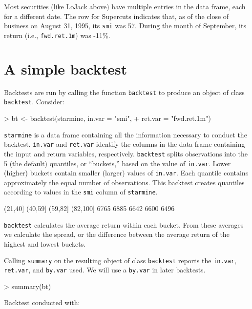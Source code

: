 \documentclass[a4paper]{report}
\begin{document}
\begin{article}
Most securities (like LoJack above) have multiple entries in the data
frame, each for a different date.  The row for Supercuts indicates
that, as of the close of business on August 31, 1995, its \texttt{smi}
was 57.  During the month of September, its return (i.e.,
\texttt{fwd.ret.1m}) was -11\%.

\section*{A simple backtest}

Backtests are run by calling the function \texttt{backtest} to
produce an object of class \texttt{backtest}.  Consider:

\begin{Schunk}
\begin{Sinput}
> bt <- backtest(starmine, in.var = "smi", 
+     ret.var = "fwd.ret.1m")
\end{Sinput}
\end{Schunk}

\texttt{starmine} is a data frame containing all the information
necessary to conduct the backtest.  \texttt{in.var} and
\texttt{ret.var} identify the columns in the data frame containing the
input and return variables, respectively. \texttt{backtest} splits
observations into the 5 (the default) quantiles, or ``buckets,'' based
on the value of \texttt{in.var}.  Lower (higher) buckets contain
smaller (larger) values of \texttt{in.var}.  Each quantile contains
approximately the equal number of observations.  This backtest creates
quantiles according to values in the \texttt{smi} column of
\texttt{starmine}.

\begin{Schunk}
\begin{Soutput}
  [1,21]  (21,40]  (40,59]  (59,82] (82,100] 
    6765     6885     6642     6600     6496 
\end{Soutput}
\end{Schunk}

\texttt{backtest} calculates the average return within each bucket.
From these averages we calculate the spread, or the difference between
the average return of the highest and lowest buckets.

Calling \texttt{summary} on the resulting object of class
\texttt{backtest} reports the \texttt{in.var}, \texttt{ret.var}, and
\texttt{by.var} used.  We will use a \texttt{by.var} in later
backtests.

\begin{Schunk}
\begin{Sinput}
> summary(bt)
\end{Sinput}
\begin{Soutput}
Backtest conducted with:


\end{Soutput}
\end{Schunk}
\end{article}
\end{document}
